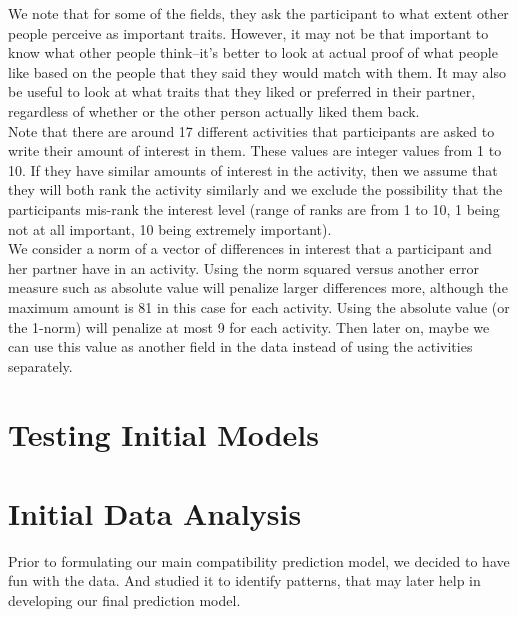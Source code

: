 \documentclass{article}
\begin{document}
We note that for some of the fields, they ask the participant to what extent other people perceive as important traits. However, it may not be that important to know what other people think--it's better to look at actual proof of what people like based on the people that they said they would match with them.  It may also be useful to look at what traits that they liked or preferred in their partner, regardless of whether or the other person actually liked them back.\\

Note that there are around 17 different activities that participants are asked to 
write their amount of interest in them.  These values are integer values from 1 to 10.  If they have similar amounts of interest in the activity, then we assume that they will both rank the activity similarly and we exclude the possibility that the participants mis-rank the interest level (range of ranks are from 1 to 10, 1 being not at all important, 10 being extremely important).\\

We consider a norm of a vector of differences in interest that a participant and her partner have in an activity.  Using the norm squared versus another error measure such as absolute value will penalize larger differences more, although the maximum amount is 81 in this case for each activity. Using the absolute value (or the 1-norm) will penalize at most 9 for each activity. Then later on, maybe we can use this value as another field in the data instead of using the activities separately. \\
 
 \section{Testing Initial Models}
 
\section{Initial Data Analysis}
Prior to formulating our main compatibility prediction model, we decided to have fun with the data. And studied it to identify patterns, that may later help in developing our final prediction model. 
\end{document}

